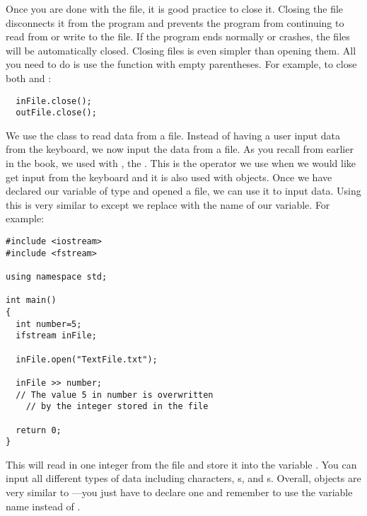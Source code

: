 
Once you are done with the file, it is good practice to close it. 
Closing the file disconnects it from the program and prevents the program from continuing to read from or write to the file. 
If the program ends normally or crashes, the files will be automatically closed. 
Closing files is even simpler than opening them. 
All you need to do is use the  function with empty parentheses. 
For example, to close both  and :

\begin{lstlisting}		
  inFile.close();
  outFile.close();
\end{lstlisting}
	

We use the  class to read data from a file. 
Instead of having a user input data from the keyboard, we now input the data from a file. 
As you recall from earlier in the book, we used  with \Code{>>}, the . 
This is the operator we use when we would like get input from the keyboard and it is also used with  objects. 
Once we have declared our variable of type  and opened a file, we can use it to input data. 
Using this is very similar to  except we replace  with the name of our variable.
For example:

\begin{lstlisting}		
#include <iostream> 
#include <fstream>
	
using namespace std;

int main()
{
  int number=5;
  ifstream inFile;

  inFile.open("TextFile.txt");

  inFile >> number; 
  // The value 5 in number is overwritten
	// by the integer stored in the file

  return 0;
}
\end{lstlisting}		

This will read in one integer from the file and store it into the variable . 
You can input all different types of data including characters, s, and s. 
Overall,  objects are very similar to ---you just have to declare one and remember to use the variable name instead of .


